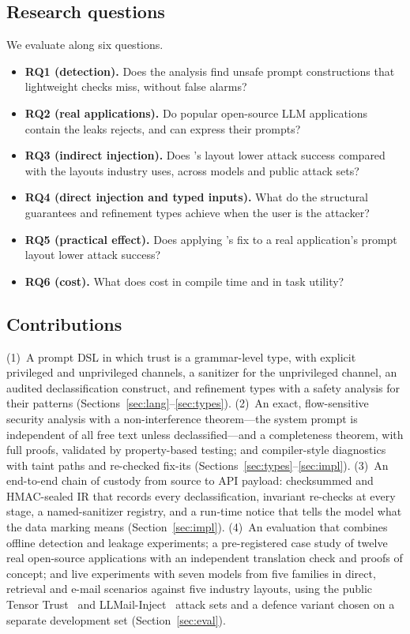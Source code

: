 \documentclass[journal]{IEEEtran}
\begin{document}
\subsection{Research questions}
We evaluate \TL{} along six questions.
\begin{itemize}
\item \textbf{RQ1 (detection).} Does the analysis find unsafe prompt constructions that lightweight checks miss, without false alarms?
\item \textbf{RQ2 (real applications).} Do popular open-source LLM applications contain the leaks \TL{} rejects, and can \TL{} express their prompts?
\item \textbf{RQ3 (indirect injection).} Does \TL{}'s layout lower attack success compared with the layouts industry uses, across models and public attack sets?
\item \textbf{RQ4 (direct injection and typed inputs).} What do the structural guarantees and refinement types achieve when the user is the attacker?
\item \textbf{RQ5 (practical effect).} Does applying \TL{}'s fix to a real application's prompt layout lower attack success?
\item \textbf{RQ6 (cost).} What does \TL{} cost in compile time and in task utility?
\end{itemize}

\subsection{Contributions}
(1)~A prompt DSL in which trust is a grammar-level type, with explicit privileged and unprivileged channels, a sanitizer for the unprivileged channel, an audited declassification construct, and refinement types with a safety analysis for their patterns (Sections~\ref{sec:lang}--\ref{sec:types}).
(2)~An exact, flow-sensitive security analysis with a non-interference theorem---the system prompt is independent of all free text unless declassified---and a completeness theorem, with full proofs, validated by property-based testing; and compiler-style diagnostics with taint paths and re-checked fix-its (Sections~\ref{sec:types}--\ref{sec:impl}).
(3)~An end-to-end chain of custody from source to API payload: checksummed and HMAC-sealed IR that records every declassification, invariant re-checks at every stage, a named-sanitizer registry, and a run-time notice that tells the model what the data marking means (Section~\ref{sec:impl}).
(4)~An evaluation that combines offline detection and leakage experiments; a pre-registered case study of twelve real open-source applications with an independent translation check and proofs of concept; and live experiments with seven models from five families in direct, retrieval and e-mail scenarios against five industry layouts, using the public Tensor Trust~\cite{toyer2024tensortrust} and LLMail-Inject~\cite{abdelnabi2025llmail} attack sets and a defence variant chosen on a separate development set (Section~\ref{sec:eval}).
\end{document}
